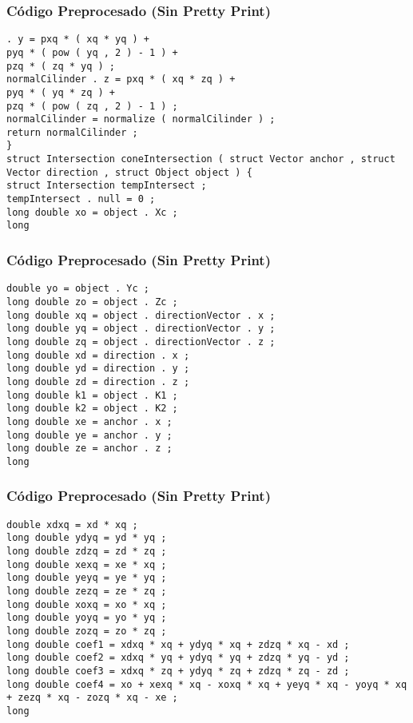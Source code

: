 \documentclass{beamer}
\begin{document}
\begin{frame}[fragile]
\frametitle{C\'odigo Preprocesado (Sin Pretty Print)}
\begin{lstlisting}[style=CStyle]
. y = pxq * ( xq * yq ) + 
pyq * ( pow ( yq , 2 ) - 1 ) + 
pzq * ( zq * yq ) ; 
normalCilinder . z = pxq * ( xq * zq ) + 
pyq * ( yq * zq ) + 
pzq * ( pow ( zq , 2 ) - 1 ) ; 
normalCilinder = normalize ( normalCilinder ) ; 
return normalCilinder ; 
} 
struct Intersection coneIntersection ( struct Vector anchor , struct Vector direction , struct Object object ) { 
struct Intersection tempIntersect ; 
tempIntersect . null = 0 ; 
long double xo = object . Xc ; 
long \end{lstlisting}
\end{frame}
\begin{frame}[fragile]
\frametitle{C\'odigo Preprocesado (Sin Pretty Print)}
\begin{lstlisting}[style=CStyle]
double yo = object . Yc ; 
long double zo = object . Zc ; 
long double xq = object . directionVector . x ; 
long double yq = object . directionVector . y ; 
long double zq = object . directionVector . z ; 
long double xd = direction . x ; 
long double yd = direction . y ; 
long double zd = direction . z ; 
long double k1 = object . K1 ; 
long double k2 = object . K2 ; 
long double xe = anchor . x ; 
long double ye = anchor . y ; 
long double ze = anchor . z ; 
long \end{lstlisting}
\end{frame}
\begin{frame}[fragile]
\frametitle{C\'odigo Preprocesado (Sin Pretty Print)}
\begin{lstlisting}[style=CStyle]
double xdxq = xd * xq ; 
long double ydyq = yd * yq ; 
long double zdzq = zd * zq ; 
long double xexq = xe * xq ; 
long double yeyq = ye * yq ; 
long double zezq = ze * zq ; 
long double xoxq = xo * xq ; 
long double yoyq = yo * yq ; 
long double zozq = zo * zq ; 
long double coef1 = xdxq * xq + ydyq * xq + zdzq * xq - xd ; 
long double coef2 = xdxq * yq + ydyq * yq + zdzq * yq - yd ; 
long double coef3 = xdxq * zq + ydyq * zq + zdzq * zq - zd ; 
long double coef4 = xo + xexq * xq - xoxq * xq + yeyq * xq - yoyq * xq + zezq * xq - zozq * xq - xe ; 
long \end{lstlisting}
\end{frame}
\end{document}
